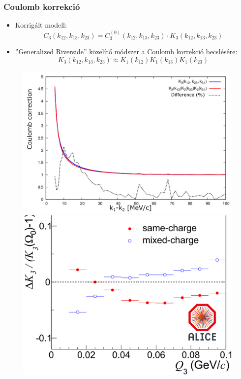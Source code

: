 \documentclass{beamer}
\begin{document}
\begin{frame}
\frametitle{Coulomb korrekció}
\begin{itemize}
\setlength{\itemsep}{12pt}
\item Korrigált modell:
\begin{equation*}
C_3(k_{12}, k_{13}, k_{23}) = C_3^{(0)}(k_{12}, k_{13}, k_{23})\cdot K_3(k_{12}, k_{13}, k_{23})
\end{equation*}
\item ''Generalized Riverside'' közelítő módszer a Coulomb korrekció becslésére:
\begin{equation*}
K_3(k_{12}, k_{13}, k_{23}) \approx K_1(k_{12})K_1(k_{13})K_1(k_{23})
\end{equation*}
\end{itemize}
\vspace*{-20pt}
\begin{figure}
\includegraphics[scale=0.25]{pic/coulomb1}
\includegraphics[scale=0.235]{pic/coulomb2}
\end{figure}
\end{frame}
\end{document}
